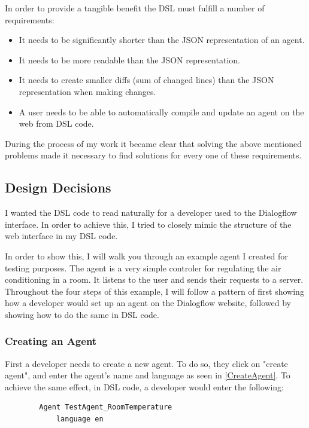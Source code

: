 In order to provide a tangible benefit the DSL must fulfill a number of requirements:
\begin{itemize}
    \item It needs to be significantly shorter than the JSON representation of an agent.
    \item It needs to be more readable than the JSON representation.
    \item It needs to create smaller diffs (sum of changed lines) than the JSON representation when making changes.
    \item A user needs to be able to automatically compile and update an agent on the web from DSL code.
\end{itemize}

During the process of my work it became clear that solving the above mentioned problems made it necessary to find solutions for every one of these requirements.

\subsection{Design Decisions}

I wanted the DSL code to read naturally for a developer used to the Dialogflow interface.
In order to achieve this, I tried to closely mimic the structure of the web interface in my DSL code.

In order to show this, I will walk you through an example agent I created for testing purposes. The agent is a very simple controler for regulating the air conditioning in a room. It listens to the user and sends their requests to a server. Throughout the four steps of this example, I will follow a pattern of first showing how a developer would set up an agent on the Dialogflow website, followed by showing how to do the same in DSL code.

\subsubsection{Creating an Agent}
First a developer needs to create a new agent. To do so, they click on "create agent", and enter the agent's name and language as seen in \autoref{CreateAgent}.
To achieve the same effect, in DSL code, a developer would enter the following:
\begin{samepage}
    \begin{verbatim}
        Agent TestAgent_RoomTemperature
            language en 
    \end{verbatim}
\end{samepage}

